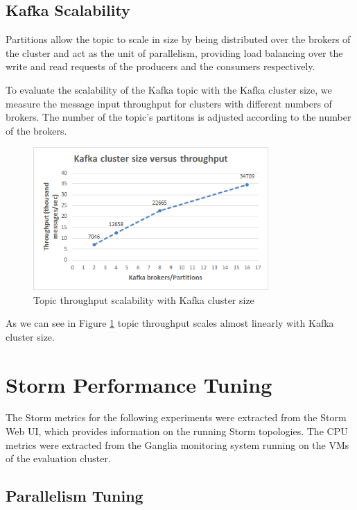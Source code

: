 \subsection{Kafka Scalability}

Partitions allow the topic to scale in size by being distributed over the brokers of the cluster and act as the unit of parallelism, providing load balancing over the write and read requests of the producers and the consumers respectively.

To evaluate the scalability of the Kafka topic with the Kafka cluster size, we measure the message input throughput for clusters with different numbers of brokers. The number of the topic's partitons is adjusted according to the number of the brokers.

\begin{figure}[H]
\centering
\includegraphics[width=0.8\textwidth]{figures/benchmarks_kafka_scalability}
\caption{Topic throughput scalability with Kafka cluster size}
\label{figure:benchmarks_kafka_scalability}
\end{figure}

As we can see in Figure \ref{figure:benchmarks_kafka_scalability} topic throughput scales almost linearly with Kafka cluster size.


\section{Storm Performance Tuning}

The Storm metrics for the following experiments were extracted from the Storm Web UI, which provides information on the running Storm topologies. The CPU metrics were extracted from the Ganglia monitoring system \cite{ganglia} running on the VMs of the evaluation cluster.

\subsection{Parallelism Tuning}\label{subsection:benchmarks_storm_tuning}


